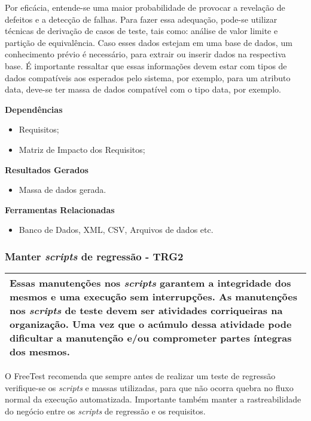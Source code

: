 Por eficácia, entende-se uma maior probabilidade de provocar a revelação de defeitos e a detecção de falhas. Para fazer essa adequação, pode-se utilizar técnicas de derivação de casos de teste, tais como: análise de valor limite e partição de equivalência. Caso esses dados estejam em uma base de dados, um conhecimento prévio é necessário, para extrair ou inserir dados na respectiva base. É importante ressaltar que essas informações devem estar com tipos de dados compatíveis aos esperados pelo sistema, por exemplo, para um atributo data, deve-se ter massa de dados compatível com o tipo data, por exemplo.

\textbf{Dependências}
\begin{itemize}
    \item Requisitos;
    \item Matriz de Impacto dos Requisitos;
\end{itemize}

\textbf{Resultados Gerados}
\begin{itemize}
    \item Massa de dados gerada.
\end{itemize}

\textbf{Ferramentas Relacionadas}
\begin{itemize}
    \item Banco de Dados, XML, CSV, Arquivos de dados etc.
\end{itemize}


\subsubsection{Manter \textit{scripts} de regressão - TRG2}
\label{sec:trg2}

\begin{table}[H]
\centering
\begin{tabular}{|p{130mm}|}
\hline
Essas manutenções nos \textit{scripts} garantem a integridade dos mesmos e uma execução sem interrupções.
As manutenções nos \textit{scripts} de teste devem ser atividades corriqueiras na organização. Uma vez que o acúmulo dessa atividade pode dificultar a manutenção e/ou comprometer partes íntegras dos mesmos. \\
\hline
\end{tabular}
\end{table}

O FreeTest recomenda que sempre antes de realizar um teste de regressão verifique-se os \textit{scripts} e massas utilizadas, para que não ocorra quebra no fluxo normal da execução automatizada. Importante também manter a rastreabilidade do negócio entre os \textit{scripts} de regressão e os requisitos.

